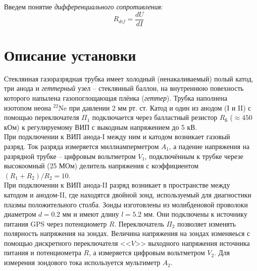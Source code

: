 \documentclass[a4paper,12pt]{article}
\begin{document}
    \newline 
    Введем понятие \textit{дифференциального сопротивления}: 
    \begin{equation}
        R_{dif} = \frac{dU}{dI}
    \end{equation}
    \newpage
    \section*{Описание установки}

  Стеклянная газоразрядная трубка имеет холодный (ненакаливаемый) полый катод, три анода и \textit{геттерный} узел -- стеклянный баллон, на внутреннюю повехность которого напылена газопоглощающая плёнка (\textit{геттер}). Трубка наполнена изотопом неона $^22$Ne при давлении 2 мм рт. ст. Катод и один из анодом (I и II) с помощью переключателя $\Pi_1$ подключается через балластный резистор $R_\text{б}$ ($\approx 450$ кОм) к регулируемому ВИП с выкодным напряжением до 5 кВ.\\
    \newline
  При подключении к ВИП анода-I между ним и катодом возникает газовый разряд. Ток разряда измеряется миллиамперметром $A_1$, а падение напряжения на разрядной трубке -- цифровым вольтметром $V_1$, подключённым к трубке черезе высокоомный (25 МОм) делитель напряжения с коэффициентом $(R_1+R_2)/R_2 = 10$.\\
    \newline
  При подключении к ВИП анода-II разряд возникает в пространстве между катодом и анодом-II, где находятся двойной зонд, используемый для диагностики плазмы положительного столба. Зонды изготовлены из молибденовой проволоки диаметром $d = 0.2$ мм и имеют длину $l = 5.2$ мм. Они подключены к источнику питания GPS через потенциометр $R$. Переключатель $\Pi_2$ позволяет изменять полярность напряжения на зондах. Величина напряжения на зондах изменяеься с помощью дискретного переключателя <<$V$>> выходного напряжения источника питания и потенциометра $R$, а измеряется цифровым вольтметром $V_2$. Для измерения зондового тока используется мультиметр $A_2$.
\end{document}
